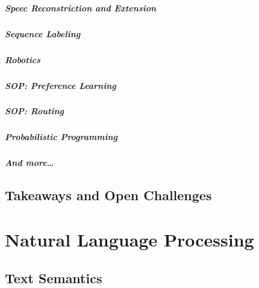 		\paragraph{Speec Reconstriction and Extension} %

		\paragraph{Sequence Labeling} %

		\paragraph{Robotics} %

		\paragraph{SOP: Preference Learning} %

		\paragraph{SOP: Routing} %

		\paragraph{Probabilistic Programming} %

		\paragraph{And more\dots} %

	\section{Takeaways and Open Challenges} %

\chapter{Natural Language Processing} %

	\section{Text Semantics} %

